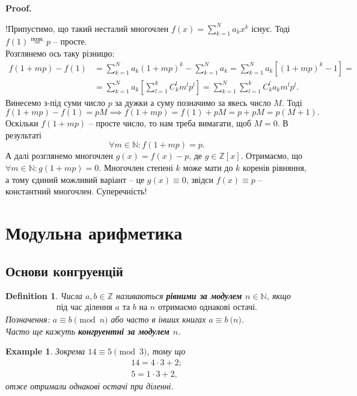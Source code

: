 \documentclass[a4paper, 10pt]{article}
\makeatletter
\theoremstyle{theoremdd}
\theoremstyle{theoremdd}
\newtheorem{definition}[theorem]{Definition}
\theoremstyle{theoremdd}
\theoremstyle{theoremdd}
\newtheorem{example}[theorem]{Example}
\theoremstyle{theoremdd}
\theoremstyle{theoremdd}
\theoremstyle{theoremdd}
\theoremstyle{theoremdd}
\renewenvironment{proof}[1][Proof.\\]{\par
\pushQED{\hfill \qed}%
\normalfont \topsep6\p@\@plus6\p@\relax
\trivlist
\item\relax
{\bfseries
#1\@addpunct{.}}\hspace\labelsep\ignorespaces
}{%
\popQED\endtrivlist\@endpefalse
}
\makeatother
\begin{document}
\begin{proof}
!Припустимо, що такий несталий многочлен $f(x) = \displaystyle\sum_{k=1}^N a_k x^k$ існує. Тоді $f(1) \overset{\text{позн.}}{=} p$ -- просте.\\
Розглянемо ось таку різницю:
\begin{align*}
f(1+mp) - f(1) & = \displaystyle\sum_{k=1}^N a_k (1+mp)^k - \sum_{k=1}^N a_k = \sum_{k=1}^N a_k \left[ (1+mp)^k-1 \right] = \\ & = \sum_{k=1}^N a_k \left[ \sum_{l=1}^k C_k^l m^l p^l \right] = \sum_{k=1}^N \sum_{l=1}^k C_k^l a_k m^l p^l.
\end{align*}
Винесемо з-під суми число $p$ за дужки а суму позначимо за якесь число $M$. Тоді
\[
f(1+mp) - f(1) = pM \implies f(1+mp) = f(1) + pM = p + pM = p(M+1).
\]
Оскільки $f(1+mp)$ -- просте число, то нам треба вимагати, щоб $M=0$. В результаті \[
\forall m \in \mathbb{N}: f(1+mp) = p.
\]
А далі розглянемо многочлен $g(x) = f(x) - p$, де $g \in \mathbb{Z}[x]$. Отримаємо, що $\forall m \in \mathbb{N}: g(1+mp) = 0$. Многочлен степені $k$ може мати до $k$ коренів рівняння, а тому єдиний можливий варіант -- це $g(x) \equiv 0$, звідси $f(x) \equiv p$ -- константний многочлен. Суперечність!
\end{proof}
\newpage

\section{Модульна арифметика}
\subsection{Основи конгруенцій}
\begin{definition}
Числа $a,b \in \mathbb{Z}$ називаються \textbf{рівними за модулем $n \in \mathbb{N}$}, якщо
\begin{align*}
\text{під час ділення $a$ та $b$ на $n$ отримаємо однакові остачі.}
\end{align*}
Позначення: $a \equiv b \pmod n$ або часто в інших книгах $a \equiv b \pod n$.\\
Часто ще кажуть \textbf{конгруентні за модулем $n$}.
\end{definition}

\begin{example}
Зокрема $14 \equiv 5 \pmod 3$, тому що
\begin{align*}
14 = 4 \cdot 3 + 2; \\
5 = 1 \cdot 3 + 2,
\end{align*}
отже отримали однакові остачі при діленні.
\end{example}
\end{document}
